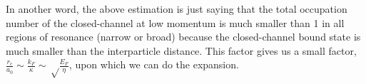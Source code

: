  



 In another word, the above estimation is just saying that the total occupation number of the closed-channel at low momentum is much smaller than 1 in all regions of resonance (narrow or broad) because the closed-channel bound state is much smaller than the interparticle distance.  This factor gives us a small factor, $\frac{r_{c}}{a_{0}}\sim\frac{k_{F}}{\kappa}\sim\sqrt\frac{E_{F}}{\eta}$, upon which we can do the expansion.  
